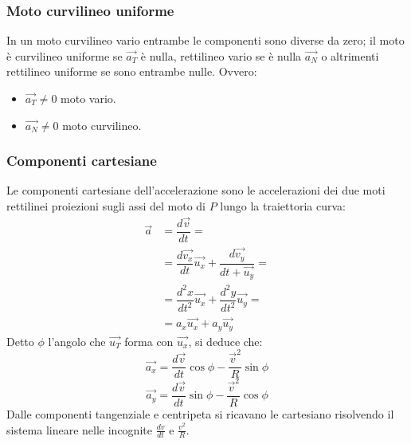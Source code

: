 \documentclass[class=book, crop=false, oneside, 12pt]{standalone}
\begin{document}
		\subsubsection{Moto curvilineo uniforme}
    In un moto curvilineo vario entrambe le componenti sono diverse da zero; il moto \`e curvilineo uniforme se $\overrightarrow{a_T}$ \`e nulla, rettilineo vario se \`e nulla $\overrightarrow{a_N}$ o altrimenti rettilineo uniforme se sono entrambe nulle.
		Ovvero:
		\begin{multicols}{2}
			\begin{itemize}
        \item $\overrightarrow{a_T}\neq 0$ moto vario.
        \item $\overrightarrow{a_N}\neq 0$ moto curvilineo.
			\end{itemize}
		\end{multicols}
		\subsubsection{Componenti cartesiane}
		Le componenti cartesiane dell'accelerazione sono le accelerazioni dei due moti rettilinei proiezioni sugli assi del moto di $P$ lungo la traiettoria curva:
		\begin{align*}
      \overrightarrow{a}&=\dfrac{d\overrightarrow{v}}{dt}=\\
                        &=\dfrac{d\overrightarrow{v_x}}{dt}\overrightarrow{u_x}+\dfrac{d\overrightarrow{v_y}}{dt+\overrightarrow{u_y}}=\\
                        &=\dfrac{d^2x}{dt^2}\overrightarrow{u_x}+\dfrac{d^2y}{dt^2}\overrightarrow{u_y}=\\
                        &=a_x\overrightarrow{u_x}+a_y\overrightarrow{u_y}
		\end{align*}
    Detto $\phi$ l'angolo che $\overrightarrow{u_T}$ forma con $\overrightarrow{u_x}$, si deduce che:
    $$\overrightarrow{a_x}=\dfrac{d\overrightarrow{v}}{dt}\cos\phi - \dfrac{\overrightarrow{v}^2}{R}\sin\phi$$
    $$\overrightarrow{a_y}=\dfrac{d\overrightarrow{v}}{dt}\sin\phi - \dfrac{\overrightarrow{v}^2}{R}\cos\phi$$
		Dalle componenti tangenziale e centripeta si ricavano le cartesiano risolvendo il sistema lineare nelle incognite $\frac{dv}{dt}$ e $\frac{v^2}{R}$.
\end{document}
